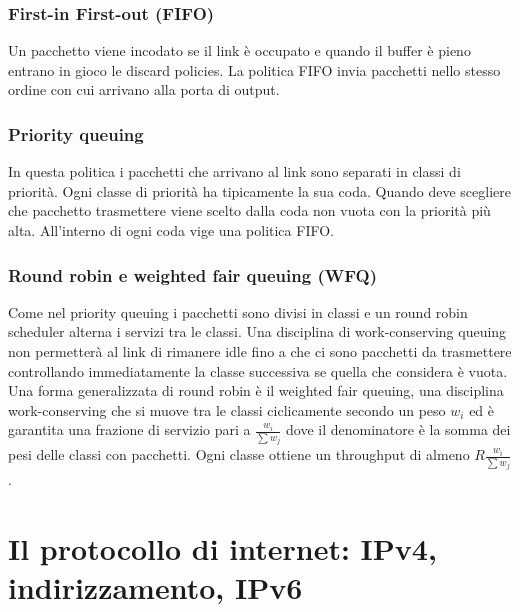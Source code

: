 \subsubsection{First-in First-out (FIFO)}
Un pacchetto viene incodato se il link \`e occupato e quando il buffer \`e pieno entrano in gioco le discard policies. La politica FIFO invia pacchetti 
nello stesso ordine con cui arrivano alla porta di output. 
\subsubsection{Priority queuing}
In questa politica i pacchetti che arrivano al link sono separati in classi di priorit\`a. Ogni classe di priorit\`a ha tipicamente la sua coda. Quando 
deve scegliere che pacchetto trasmettere viene scelto dalla coda non vuota con la priorit\`a pi\`u alta. All'interno di ogni coda vige una politica FIFO.
\subsubsection{Round robin e weighted fair queuing (WFQ)}
Come nel priority queuing i pacchetti sono divisi in classi e un round robin scheduler alterna i servizi tra le classi. Una disciplina di work-conserving 
queuing non permetter\`a al link di rimanere idle fino a che ci sono pacchetti da trasmettere controllando immediatamente la classe successiva se quella
che considera \`e vuota. Una forma generalizzata di round robin \`e il weighted fair queuing, una disciplina work-conserving che si muove tra le classi
ciclicamente secondo un peso $w_i$ ed \`e garantita una frazione di servizio pari a $\frac{w_i}{\sum w_j}$ dove il denominatore \`e la somma dei pesi delle
classi con pacchetti. Ogni classe ottiene un throughput di almeno $R\frac{w_i}{\sum w_j}$.
\section{Il protocollo di internet: IPv4, indirizzamento, IPv6}

